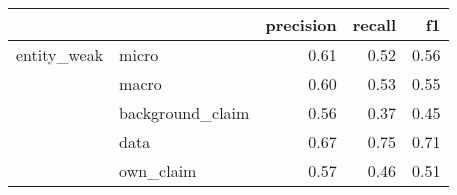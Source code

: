 \begin{tabular}{llrrr}
\toprule
            &           &  precision &  recall &   f1 \\
\midrule
entity\_weak & micro &       0.61 &    0.52 & 0.56 \\
            & macro &       0.60 &    0.53 & 0.55 \\
            & background\_claim &       0.56 &    0.37 & 0.45 \\
            & data &       0.67 &    0.75 & 0.71 \\
            & own\_claim &       0.57 &    0.46 & 0.51 \\
\bottomrule
\end{tabular}
